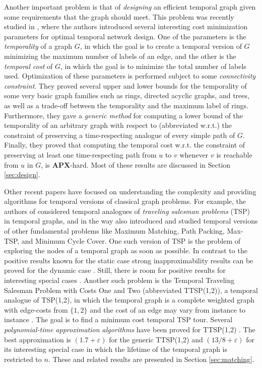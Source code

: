 \documentclass[oribibl, 11pt]{llncs}
\newcommand{\rem}{\mathbf}
\begin{document}
Another important problem is that of \emph{designing} an efficient temporal graph given some requirements that the graph should meet. This problem was recently studied in \cite{MMCS13}, where the authors introduced several interesting cost minimization parameters for optimal temporal network design. One of the parameters is the \emph{temporality} of a graph $G$, in which the goal is to create a temporal version of $G$ minimizing the maximum number of labels of an edge, and the other is the \emph{temporal cost} of $G$, in which the goal is to minimize the total number of labels used. Optimization of these parameters is performed subject to some \emph{connectivity constraint}. They proved several upper and lower bounds for the temporality of some very basic graph families such as rings, directed acyclic graphs, and trees, as well as a trade-off between the temporality and the maximum label of rings. Furthermore, they gave a \emph{generic method} for computing a lower bound of the temporality of an arbitrary graph with respect to (abbreviated w.r.t.) the constraint of preserving a time-respecting analogue of every simple path of $G$. Finally, they proved that computing the temporal cost w.r.t. the constraint of preserving at least one time-respecting path from $u$ to $v$ whenever $v$ is reachable from $u$ in $G$, is $\rem{APX}$-hard. Most of these results are discussed in Section \ref{sec:design}.

Other recent papers have focused on understanding the complexity and providing algorithms for temporal versions of classical graph problems. For example, the authors of \cite{MS14} considered temporal analogues of \emph{traveling salesman problems} (TSP) in temporal graphs, and in the way also introduced and studied temporal versions of other fundamental problems like {\sc Maximum Matching}, {\sc Path Packing}, {\sc Max-TSP}, and {\sc Minimum Cycle Cover}. One such version of TSP is the problem of exploring the nodes of a temporal graph as soon as possible. In contrast to the positive results known for the static case strong inapproximability results can be proved for the dynamic case \cite{MS14,EHK15}. Still, there is room for positive results for interesting special cases \cite{EHK15}. Another such problem is the {\sc Temporal Traveling Salesman Problem with Costs One and Two} (abbreviated TTSP(1,2)), a temporal analogue of TSP(1,2), in which the temporal graph is a complete weighted graph with edge-costs from $\{1,2\}$ and the cost of an edge may vary from instance to instance \cite{MS14}. The goal is to find a minimum cost temporal TSP tour. Several \emph{polynomial-time approximation algorithms} have been proved for TTSP(1,2) \cite{MS14}. The best approximation is $(1.7+\varepsilon)$ for the generic TTSP(1,2) and $(13/8+\varepsilon)$ for its interesting special case in which the lifetime of the temporal graph is restricted to $n$. These and related results are presented in Section \ref{sec:matching}.
\end{document}
